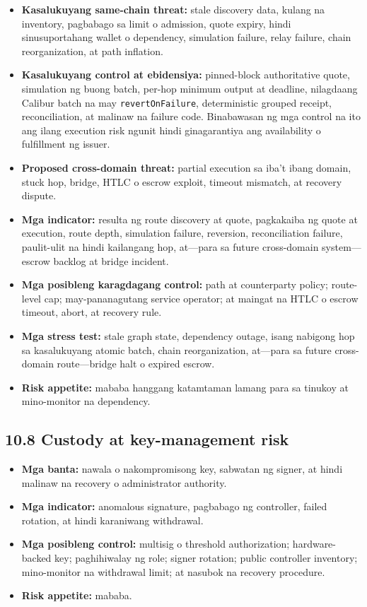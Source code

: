 \documentclass[11pt]{article}
\begin{document}
\begin{itemize}[leftmargin=*]
\item \textbf{Kasalukuyang same-chain threat:} stale discovery data, kulang na inventory, pagbabago sa limit o admission, quote expiry, hindi sinusuportahang wallet o dependency, simulation failure, relay failure, chain reorganization, at path inflation.
\item \textbf{Kasalukuyang control at ebidensiya:} pinned-block authoritative quote, simulation ng buong batch, per-hop minimum output at deadline, nilagdaang Calibur batch na may \texttt{revertOnFailure}, deterministic grouped receipt, reconciliation, at malinaw na failure code. Binabawasan ng mga control na ito ang ilang execution risk ngunit hindi ginagarantiya ang availability o fulfillment ng issuer.
\item \textbf{Proposed cross-domain threat:} partial execution sa iba't ibang domain, stuck hop, bridge, HTLC o escrow exploit, timeout mismatch, at recovery dispute.
\item \textbf{Mga indicator:} resulta ng route discovery at quote, pagkakaiba ng quote at execution, route depth, simulation failure, reversion, reconciliation failure, paulit-ulit na hindi kailangang hop, at---para sa future cross-domain system---escrow backlog at bridge incident.
\item \textbf{Mga posibleng karagdagang control:} path at counterparty policy; route-level cap; may-pananagutang service operator; at maingat na HTLC o escrow timeout, abort, at recovery rule.
\item \textbf{Mga stress test:} stale graph state, dependency outage, isang nabigong hop sa kasalukuyang atomic batch, chain reorganization, at---para sa future cross-domain route---bridge halt o expired escrow.
\item \textbf{Risk appetite:} mababa hanggang katamtaman lamang para sa tinukoy at mino-monitor na dependency.
\end{itemize}
\subsection*{10.8 Custody at key-management risk}

\begin{itemize}[leftmargin=*]
\item \textbf{Mga banta:} nawala o nakompromisong key, sabwatan ng signer, at hindi malinaw na recovery o administrator authority.
\item \textbf{Mga indicator:} anomalous signature, pagbabago ng controller, failed rotation, at hindi karaniwang withdrawal.
\item \textbf{Mga posibleng control:} multisig o threshold authorization; hardware-backed key; paghihiwalay ng role; signer rotation; public controller inventory; mino-monitor na withdrawal limit; at nasubok na recovery procedure.
\item \textbf{Risk appetite:} mababa.
\end{itemize}
\end{document}
